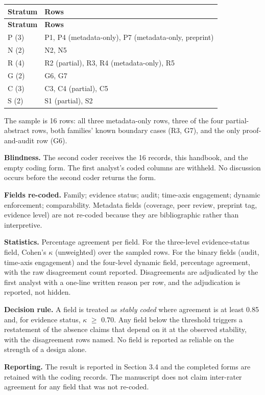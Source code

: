 \documentclass[11pt]{article}
\begin{document}
\begingroup
\begin{longtable}{@{}p{}p{}@{}}
\toprule
\textbf{Stratum} & \textbf{Rows} \\
\midrule
\endfirsthead
\toprule
\textbf{Stratum} & \textbf{Rows} \\
\midrule
\endhead
P (3) & P1, P4 (metadata-only), P7 (metadata-only, preprint) \\
N (2) & N2, N5 \\
R (4) & R2 (partial), R3, R4 (metadata-only), R5 \\
G (2) & G6, G7 \\
C (3) & C3, C4 (partial), C5 \\
S (2) & S1 (partial), S2 \\
\bottomrule
\end{longtable}
\endgroup

The sample is 16 rows: all three metadata-only rows, three of the four partial-abstract rows, both families' known boundary cases (R3, G7), and the only proof-and-audit row (G6).

\textbf{Blindness.} The second coder receives the 16 records, this handbook, and the empty coding form. The first analyst's coded columns are withheld. No discussion occurs before the second coder returns the form.

\textbf{Fields re-coded.} Family; evidence status; audit; time-axis engagement; dynamic enforcement; comparability. Metadata fields (coverage, peer review, preprint tag, evidence level) are not re-coded because they are bibliographic rather than interpretive.

\textbf{Statistics.} Percentage agreement per field. For the three-level evidence-status field, Cohen's $\kappa$ (unweighted) over the sampled rows. For the binary fields (audit, time-axis engagement) and the four-level dynamic field, percentage agreement, with the raw disagreement count reported. Disagreements are adjudicated by the first analyst with a one-line written reason per row, and the adjudication is reported, not hidden.

\textbf{Decision rule.} A field is treated as \textit{stably coded} where agreement is at least 0.85 and, for evidence status, $\kappa$ $\geq$ 0.70. Any field below the threshold triggers a restatement of the absence claims that depend on it at the observed stability, with the disagreement rows named. No field is reported as reliable on the strength of a design alone.

\textbf{Reporting.} The result is reported in Section 3.4 and the completed forms are retained with the coding records. The manuscript does not claim inter-rater agreement for any field that was not re-coded.
\end{document}
